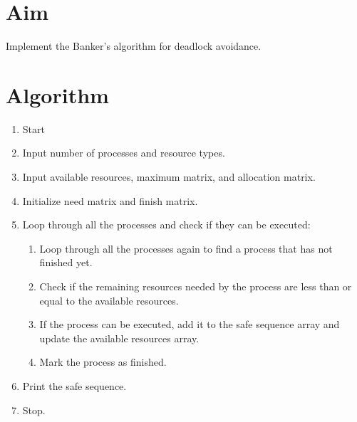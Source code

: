 
\section{Aim}
Implement the Banker’s algorithm for deadlock avoidance.

\section{Algorithm}
\begin{enumerate}
    \item Start
    \item Input number of processes and resource types.
    \item Input available resources, maximum matrix, and allocation matrix.
    \item Initialize need matrix and finish matrix.
    \item Loop through all the processes and check if they can be executed:
    \begin{enumerate}
        \item Loop through all the processes again to find a process that has not finished yet.
        \item Check if the remaining resources needed by the process are less than or equal to the available resources.
        \item If the process can be executed, add it to the safe sequence array and update the available resources array.
        \item Mark the process as finished.
    \end{enumerate}
    \item Print the safe sequence.
    \item Stop.
\end{enumerate}

